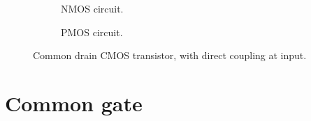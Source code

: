 	\begin{figure}[htb]
		\centering
		\begin{subfigure}[b]{0.49\textwidth}
			\centering
			
			\caption{NMOS circuit.%
				\label{fig__mos_nmos_common_drain_direct_coupling}}
		\end{subfigure}
		\hfill
		\begin{subfigure}[b]{0.49\textwidth}
			\centering
			
			\caption{PMOS circuit.%
				\label{fig__mos_pmos_common_drain_direct_coupling}}
		\end{subfigure}
		\caption{Common drain CMOS transistor, with direct coupling at input.%
			\label{fig__mos_common_drain_direct_coupling}}
	\end{figure}



\section{Common gate}


	
	
%		
%	
%		
